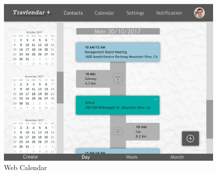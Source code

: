 \begin{figure}[!h]
\begin{minipage}{.65\textwidth}
		\includegraphics[width=\linewidth]{Images/Mockups/MockupCalendarWeb.png}
		\caption{Web Calendar}
	\end{minipage}
\end{figure}


